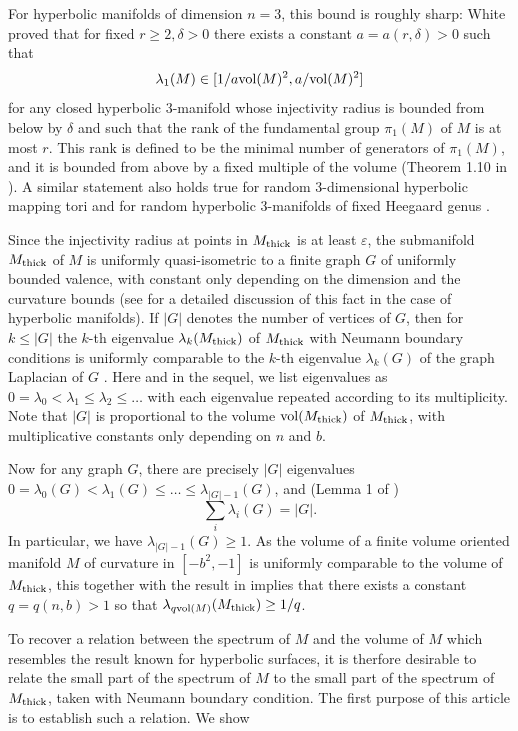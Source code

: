 \documentclass[11pt]{amsart}
\theoremstyle{plain}
\theoremstyle{plain}
\theoremstyle{definition}
\renewcommand{\epsilon}{\varepsilon}
\begin{document}
For hyperbolic manifolds of dimension $n=3$, this bound is roughly sharp:  
White \cite{White} 
proved that for fixed $r \geq 2, \delta > 0$ 
there exists a constant 
 $a=a(r,\delta)>0$ such that 
 \[ \lambda_1(M)\in [1/a {\rm vol}(M)^2, a/{\rm vol}(M)^2]\]
 for any closed 
hyperbolic 3-manifold whose injectivity radius is bounded from 
below by $\delta$ and such 
that the rank of the fundamental group $\pi_1(M)$ of $M$ is at most $r$.
This rank is defined to be the minimal number of generators of 
$\pi_1(M)$, and it 
is bounded from above by a fixed multiple of the
volume (Theorem 1.10 in \cite{G04}). A similar statement also holds
true for random 3-dimensional hyperbolic mapping tori \cite{BGH}
and for random hyperbolic 3-manifolds of fixed Heegaard genus
\cite{HV19}. 



Since the injectivity radius at points in $M_{\rm thick}$ is 
at least $\epsilon$, the submanifold $M_{\rm thick}$ of $M$ is 
uniformly
quasi-isometric to a finite graph $G$ of uniformly 
bounded valence, with constant
only depending on the dimension and the curvature bounds 
(see \cite{BGLM02} for a detailed discussion of this fact 
in the case of hyperbolic manifolds). 
If $\vert G\vert $ denotes 
the number of vertices of $G$, 
then for $k\leq \vert G\vert $ the $k$-th eigenvalue
$\lambda_k(M_{\rm thick})$ of $M_{\rm thick}$ with Neumann boundary
conditions is uniformly comparable to the $k$-th eigenvalue 
$\lambda_k(G)$ 
of the graph 
Laplacian of $G$ \cite{Man05}. 
Here and in the sequel, we list eigenvalues as 
$0=\lambda_0<\lambda_1\leq \lambda_2\leq \dots$
with each eigenvalue repeated according to its multiplicity. 
Note that $\vert G\vert $ is proportional to the 
volume ${\rm vol}(M_{\rm thick})$ of $M_{\rm thick}$, 
with multiplicative constants only depending on $n$ and $b$.

Now for any graph $G$, there are precisely $\vert G\vert$ eigenvalues
$0=\lambda_0(G)<\lambda_1(G)\leq\dots\leq \lambda_{\vert G\vert -1}(G)$, and
(Lemma 1 of \cite{Chu96})  
\[\sum_i\lambda_i(G)=\vert G\vert.\]
In particular, we have $\lambda_{\vert G\vert-1}(G)\geq 1$.
As the volume of a finite volume oriented manifold $M$ of curvature in 
$[-b^2,-1]$ is uniformly comparable to the volume of $M_{\rm thick}$, this 
together with the result in \cite{Man05} implies 
that there exists a constant
$q=q(n,b)>1$ so that $\lambda_{q{\rm vol}(M)}(M_{\rm thick})\geq 1/q$. 

To recover a relation between the spectrum of $M$ and the
volume of $M$ which resembles the result known for hyperbolic surfaces,
it is therfore  
desirable
to relate the small part of the spectrum of $M$ to the small part
of the spectrum of $M_{\rm thick}$, taken with Neumann boundary condition.
The first purpose of this
article is to establish such a relation. We show
\end{document}
